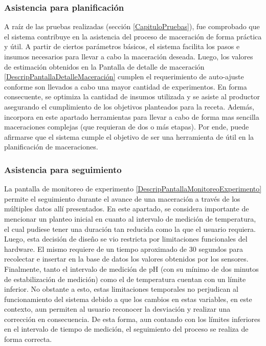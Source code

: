 \subsubsection{Asistencia para planificación} 
\par A raíz de las pruebas realizadas (sección \ref{CapituloPruebas}), fue comprobado que el sistema contribuye en la asistencia del proceso de maceración de forma práctica y útil. A partir de ciertos parámetros básicos, el sistema facilita los pasos e insumos necesarios para llevar a cabo la maceración deseada. Luego, los valores de estimación obtenidos en la Pantalla de detalle de maceración \ref{DescripPantallaDetalleMaceración} cumplen el requerimiento de auto-ajuste conforme son llevados a cabo una mayor cantidad de experimentos. En forma consecuente, se optimiza la cantidad de insumos utilizada y se asiste al productor asegurando el cumplimiento de los objetivos planteados para la receta. Además, incorpora en este apartado herramientas para llevar a cabo de forma mas sencilla maceraciones complejas (que requieran de dos o más etapas). Por ende, puede afirmarse que el sistema cumple el objetivo de ser una herramienta de útil en la planificación de maceraciones.

\subsubsection{Asistencia para seguimiento}
\par La pantalla de monitoreo de experimento \ref{DescripPantallaMonitoreoExperimento} permite el seguimiento durante el avance de una maceración a través de los múltiples datos allí presentados. En este apartado, se considera importante de mencionar un planteo inicial en cuanto al intervalo de medición de temperatura, el cual pudiese tener una duración tan reducida como la que el usuario requiera. Luego, esta decisión de diseño se vio restricta por limitaciones funcionales del hardware. El mismo requiere de un tiempo aproximado de 30 segundos para recolectar e insertar en la base de datos los valores obtenidos por los sensores. Finalmente, tanto el intervalo de medición de pH (con su mínimo de dos minutos de estabilización de medición) como el de temperatura cuentan con un límite inferior. No obstante a esto, estas limitaciones temporales no perjudican al funcionamiento del sistema debido a que los cambios en estas variables, en este contexto, aun permiten al usuario reconocer la desviación y realizar una corrección en consecuencia. De esta forma, aun contando con los límites inferiores en el intervalo de tiempo de medición, el seguimiento del proceso se realiza de forma correcta.

